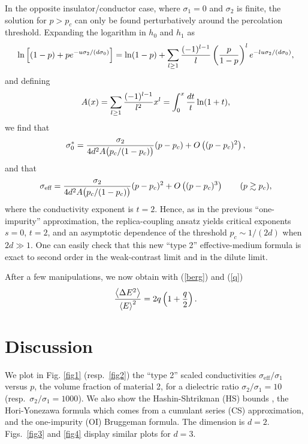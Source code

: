 In the opposite insulator/conductor case, where $\sigma_1=0$ 
and $\sigma_2$ is finite, the solution for $p>p_c$ can only be found perturbatively around the percolation threshold. Expanding the 
logarithm in $h_0$ and $h_1$ as
\begin{equation}
\ln\left[(1-p)+p
e^{-u\sigma_2/(d\sigma_0)}\right]=\ln(1-p)+\sum_{l\geq
1}{(-1)^{l-1}\over l}\left({p\over 1-p}\right)^l
e^{-lu\sigma_2/(d\sigma_0)},
\end{equation}
and defining
\begin{equation}
A(x)=\sum_{l\geq 1} {(-1)^{l-1}\over l^2} x^l=\int_0^x {dt\over t}
\ln(1+t),
\end{equation}
we find that 
\begin{equation}
\sigma_0^*={\sigma_2\over 4 d^2 A\bigl(p_c/(1-p_c)\bigr)}(p-p_c)+O
\left((p-p_c)^2\right),
\end{equation}
and that
\begin{equation}
\sigma_{\text{eff}}={\sigma_2\over
4d^2 A\bigl(p_c/(1-p_c)\bigr)}(p-p_c)^2+O\left((p-p_c)^3\right)
\qquad (p\gtrsim p_c),
\end{equation} 
where the conductivity exponent is $t=2$. Hence, as in the previous
``one-impurity'' approximation, the replica-coupling ansatz yields
critical exponents $s=0$, $t=2$, and an asymptotic dependence of the
threshold $p_c\sim 1/(2d)$ when $2d\gg 1$. One can easily check that
this new ``type 2'' effective-medium formula is exact to second order
in the weak-contrast limit and in the dilute limit.

After a few manipulations, we now obtain with (\ref{berg}) and (\ref{q}) 
\begin{equation}
{\left\langle \Delta E^2\right\rangle\over \left\langle E\right\rangle^2}
=2q\left(1+\frac{q}{2}\right).
\end{equation}

\section{Discussion}
\label{d}

We plot in Fig. \ref{fig1} (resp.\ \ref{fig2}) the ``type 2'' scaled
conductivities $\sigma_{\text{eff}}/\sigma_1$ versus $p$, the volume
fraction of material 2, for a dielectric ratio $\sigma_2/\sigma_1=10$
(resp.\ $\sigma_2/\sigma_1=1000$). We also show the Hashin-Shtrikman
(HS) bounds \cite{HASH62}, the Hori-Yonezawa formula which comes from
a cumulant series (CS) approximation, and the one-impurity (OI)
Bruggeman formula.  The dimension is $d=2$. Figs.\ \ref{fig3} and
\ref{fig4} display similar plots for $d=3$.

